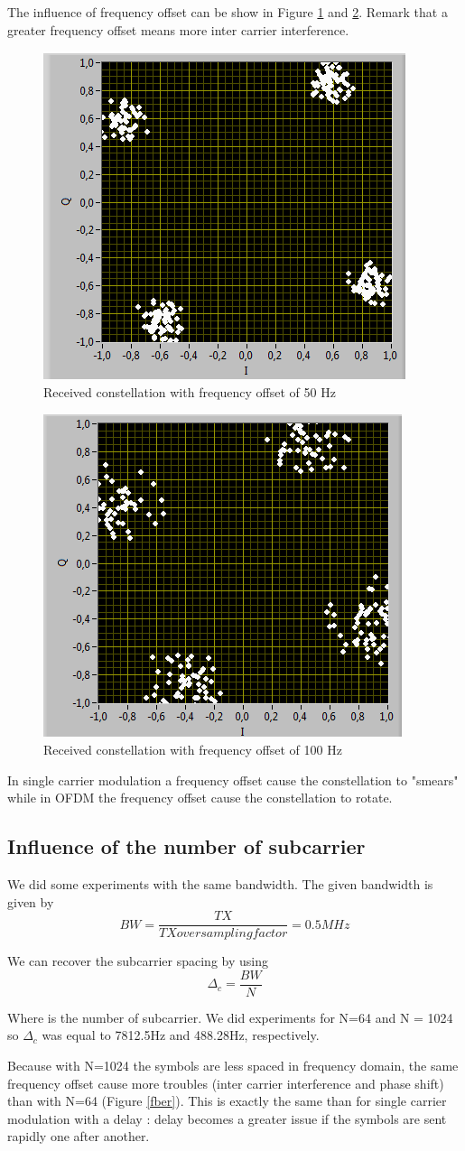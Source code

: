 \documentclass{article}
\begin{document}
    The influence of frequency offset can be show in Figure \ref{50} and \ref{100}. Remark that a greater frequency offset means more inter carrier interference.
    \begin{figure}[h!]
        \centering
        \includegraphics[width = 0.3 \textwidth]{off50_1024.PNG}
        \caption{Received constellation with frequency offset of 50 Hz}
        \label{50}
    \end{figure}
    \begin{figure}[h!]
        \centering
        \includegraphics[width = 0.3 \textwidth]{off100_1024.PNG}
        \caption{Received constellation with frequency offset of 100 Hz}
        \label{100}
    \end{figure}
    In single carrier modulation a frequency offset cause the constellation to "smears" while in OFDM the frequency offset cause the constellation to rotate. 
    
    \subsection*{Influence of the number of subcarrier}
    We did some experiments with the same bandwidth. The given bandwidth is given by
    $$  BW = \frac{TX}{TX oversampling factor} = 0.5MHz$$
        
    We can recover the subcarrier spacing by using
    $$ \Delta _c = \frac{BW}{N}$$
        
    Where is the number of subcarrier. We did experiments for N=64 and N = 1024 so $\Delta_c$ was equal to  7812.5Hz and 488.28Hz, respectively.
    
    Because with N=1024 the symbols are less spaced in frequency domain, the same frequency offset cause more troubles (inter carrier interference and phase shift) than with N=64 (Figure \ref{fber}). This is exactly the same than for single carrier modulation with a delay : delay becomes a greater issue if the symbols are sent rapidly one after another.
    
\end{document}
